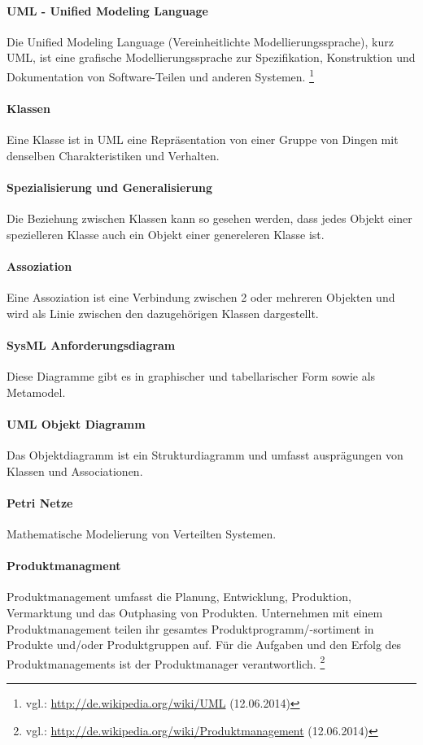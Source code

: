 \paragraph{UML - Unified Modeling Language}
Die Unified Modeling Language (Vereinheitlichte Modellierungssprache), kurz UML, ist eine grafische Modellierungssprache zur Spezifikation, Konstruktion und Dokumentation von Software-Teilen und anderen Systemen. \footnote{vgl.: \url{http://de.wikipedia.org/wiki/UML} (12.06.2014)}

\paragraph{Klassen}
Eine Klasse ist in UML eine Repräsentation von einer Gruppe von Dingen mit denselben Charakteristiken und Verhalten.

\paragraph{Spezialisierung und Generalisierung}
Die Beziehung zwischen Klassen kann so gesehen werden, dass jedes Objekt einer spezielleren Klasse auch ein Objekt einer genereleren Klasse ist.

\paragraph{Assoziation}
Eine Assoziation ist eine Verbindung zwischen 2 oder mehreren Objekten und wird als Linie zwischen den dazugehörigen Klassen dargestellt.

\paragraph{SysML Anforderungsdiagram}
Diese Diagramme gibt es in graphischer und tabellarischer Form sowie als Metamodel.

\paragraph{UML Objekt Diagramm}
Das Objektdiagramm ist ein Strukturdiagramm und umfasst ausprägungen von Klassen und Associationen.

\paragraph{Petri Netze}
Mathematische Modelierung von Verteilten Systemen.

\paragraph{Produktmanagment}
Produktmanagement umfasst die Planung, Entwicklung, Produktion, Vermarktung und das Outphasing von Produkten. Unternehmen mit einem Produktmanagement teilen ihr gesamtes Produktprogramm/-sortiment in Produkte und/oder Produktgruppen auf. Für die Aufgaben und den Erfolg des Produktmanagements ist der Produktmanager verantwortlich. \footnote{vgl.: \url{http://de.wikipedia.org/wiki/Produktmanagement} (12.06.2014)}

